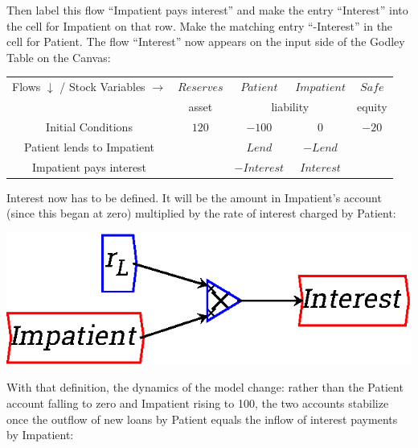 Then label this flow ``Impatient pays interest'' and make the entry
``Interest'' into the cell for Impatient on that row. Make the matching
entry ``-Interest'' in the cell for Patient. The flow ``Interest'' now
appears on the input side of the Godley Table on the Canvas: 

\begin{center}
\begin{tabular}{|c|cccc|}
\hline
Flows $\downarrow$ / Stock Variables $\rightarrow$&\multicolumn{1}{|c|}{$Reserves$}&\multicolumn{1}{|c|}{$Patient$}&\multicolumn{1}{|c|}{$Impatient$}&\multicolumn{1}{|c|}{$Safe$}\\\cline{2-5}&\multicolumn{1}{|c|}{asset}&\multicolumn{2}{|c|}{liability}&\multicolumn{1}{|c|}{equity}\\\hline
Initial Conditions&$120$&$-100$&$0$&$-20$\\
Patient lends to Impatient&&$Lend$&$-Lend$&\\
Impatient pays interest&&$-Interest$&$Interest$&\\
\hline
\end{tabular}
\end{center}

Interest now has to be defined. It will be the amount in Impatient's
account (since this began at zero) multiplied by the rate of interest
charged by Patient:

\begin{center}
\includegraphics{images/NewItem173.eps}
\end{center}

With that definition, the dynamics of the model change: rather than
the Patient account falling to zero and Impatient rising to 100, the
two accounts stabilize once the outflow of new loans by Patient equals
the inflow of interest payments by Impatient:

